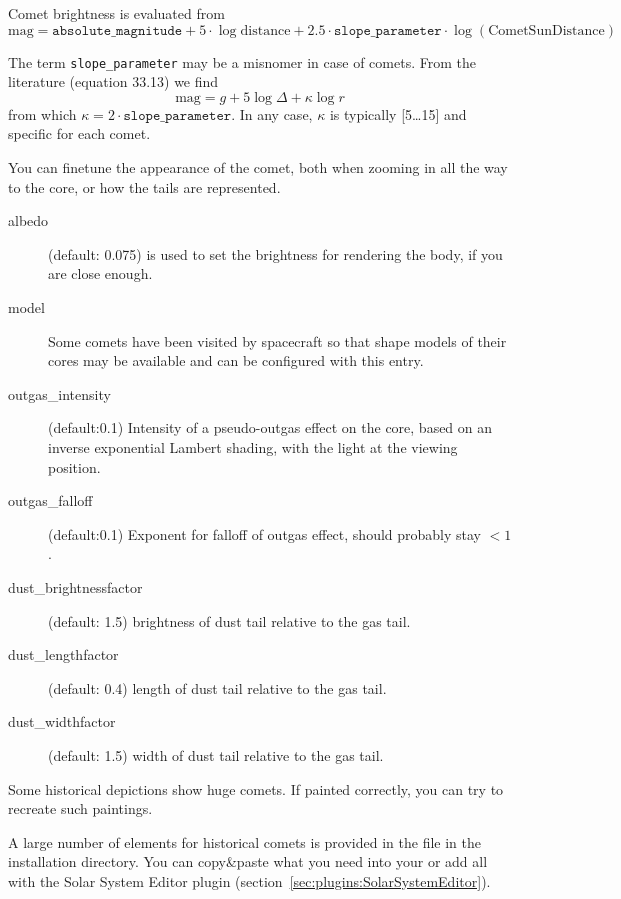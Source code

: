 Comet brightness is evaluated from
\begin{equation}
  \label{eq:comet_magnitudes}
  \mathrm{mag}=\mathtt{absolute\_magnitude}+5\cdot\log{\mathrm{distance}} + 2.5\cdot\mathtt{slope\_parameter}\cdot\log(\mathrm{CometSunDistance})
\end{equation}

The term \texttt{slope\_parameter} may be a misnomer in case of
comets. From the literature \citep{AstronomicalAlgorithms:1998} (equation 33.13) we find
\begin{equation}
  \label{eq:comet_magnitudes_Meeus}
  \mathrm{mag}=g+5\log\Delta + \kappa\log r
\end{equation}
from which $\kappa=2\cdot\mathtt{slope\_parameter}$. In any case, $\kappa$ is typically [5\ldots15] and specific for each comet.

You can finetune the appearance of the comet, both when zooming in all the way to the core, or how the tails are represented. 
\begin{description}
\item[albedo] (default: 0.075) is used to set the brightness for rendering the body, if you are close enough. 
\item[model] Some comets have been visited by spacecraft so that shape models of their cores 
	may be available and can be configured with this entry.
\item[outgas\_intensity] (default:0.1) Intensity of a pseudo-outgas effect on the core, based on an inverse exponential Lambert shading, with the light at the viewing position.
\item[outgas\_falloff] (default:0.1)  Exponent for falloff of outgas effect, should probably stay $< 1$.
\item[dust\_brightnessfactor] (default: 1.5) brightness of dust tail relative to the gas tail.
\item[dust\_lengthfactor] (default: 0.4) length of dust tail relative to the gas tail.
\item[dust\_widthfactor] (default: 1.5) width of dust tail relative to the gas tail.
\end{description}
Some historical depictions show huge comets. If painted correctly, you can try to recreate such paintings.

A large number of elements for historical comets is provided in the
file  in the installation directory. You
can copy\&paste what you need into your
 or add all with the Solar System Editor plugin (section~\ref{sec:plugins:SolarSystemEditor}). 



